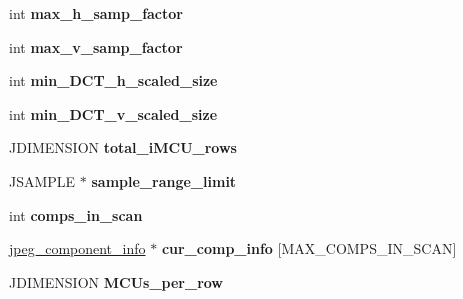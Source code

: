 \begin{DoxyCompactItemize}
\item 
\mbox{\label{structjpeg__decompress__struct_afc5bee7fabe4ce4077cc9b5cfeed293e}} 
int {\bfseries max\+\_\+h\+\_\+samp\+\_\+factor}
\item 
\mbox{\label{structjpeg__decompress__struct_a68f2fb927f484d230445e582554ea681}} 
int {\bfseries max\+\_\+v\+\_\+samp\+\_\+factor}
\item 
\mbox{\label{structjpeg__decompress__struct_ac296c113947b0c1c3b8e55d27b7a1a24}} 
int {\bfseries min\+\_\+\+D\+C\+T\+\_\+h\+\_\+scaled\+\_\+size}
\item 
\mbox{\label{structjpeg__decompress__struct_a8ec04ad4d4850c9f1bfc01724c22e18d}} 
int {\bfseries min\+\_\+\+D\+C\+T\+\_\+v\+\_\+scaled\+\_\+size}
\item 
\mbox{\label{structjpeg__decompress__struct_a042629051be990c43febe548459e731b}} 
J\+D\+I\+M\+E\+N\+S\+I\+ON {\bfseries total\+\_\+i\+M\+C\+U\+\_\+rows}
\item 
\mbox{\label{structjpeg__decompress__struct_ad492f1fd0fb0e1ce9a0f9f98cf8974fc}} 
J\+S\+A\+M\+P\+LE $\ast$ {\bfseries sample\+\_\+range\+\_\+limit}
\item 
\mbox{\label{structjpeg__decompress__struct_a4ff3bda3835712b0ce0342e9746cd2ff}} 
int {\bfseries comps\+\_\+in\+\_\+scan}
\item 
\mbox{\label{structjpeg__decompress__struct_aa2f0bf5dff97a2676995b34140793825}} 
\hyperlink{structjpeg__component__info}{jpeg\+\_\+component\+\_\+info} $\ast$ {\bfseries cur\+\_\+comp\+\_\+info} \mbox{[}M\+A\+X\+\_\+\+C\+O\+M\+P\+S\+\_\+\+I\+N\+\_\+\+S\+C\+AN\mbox{]}
\item 
\mbox{\label{structjpeg__decompress__struct_a4bf94c89145c48b582a27eb183d96f9d}} 
J\+D\+I\+M\+E\+N\+S\+I\+ON {\bfseries M\+C\+Us\+\_\+per\+\_\+row}
\item 
\mbox{\label{structjpeg__decompress__struct_ad9d524904177bde3e1e9c515af882552}} 

\end{DoxyCompactItemize}
